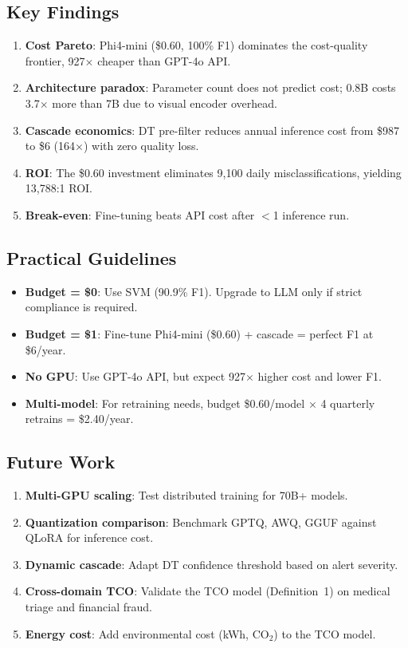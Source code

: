 \documentclass[review,3p]{elsarticle}
\begin{document}
\subsection{Key Findings}
\begin{enumerate}
\item \textbf{Cost Pareto}: Phi4-mini (\$0.60, 100\% F1) dominates the cost-quality frontier, 927$\times$ cheaper than GPT-4o API.
\item \textbf{Architecture paradox}: Parameter count does not predict cost; 0.8B costs 3.7$\times$ more than 7B due to visual encoder overhead.
\item \textbf{Cascade economics}: DT pre-filter reduces annual inference cost from \$987 to \$6 (164$\times$) with zero quality loss.
\item \textbf{ROI}: The \$0.60 investment eliminates 9,100 daily misclassifications, yielding 13,788:1 ROI.
\item \textbf{Break-even}: Fine-tuning beats API cost after $<$1 inference run.
\end{enumerate}

\subsection{Practical Guidelines}
\begin{itemize}
\item \textbf{Budget = \$0}: Use SVM (90.9\% F1). Upgrade to LLM only if strict compliance is required.
\item \textbf{Budget = \$1}: Fine-tune Phi4-mini (\$0.60) + cascade = perfect F1 at \$6/year.
\item \textbf{No GPU}: Use GPT-4o API, but expect 927$\times$ higher cost and lower F1.
\item \textbf{Multi-model}: For retraining needs, budget \$0.60/model $\times$ 4 quarterly retrains = \$2.40/year.
\end{itemize}

\subsection{Future Work}
\begin{enumerate}
\item \textbf{Multi-GPU scaling}: Test distributed training for 70B+ models.
\item \textbf{Quantization comparison}: Benchmark GPTQ, AWQ, GGUF against QLoRA for inference cost.
\item \textbf{Dynamic cascade}: Adapt DT confidence threshold based on alert severity.
\item \textbf{Cross-domain TCO}: Validate the TCO model (Definition~1) on medical triage and financial fraud.
\item \textbf{Energy cost}: Add environmental cost (kWh, CO$_2$) to the TCO model.
\end{enumerate}
\end{document}
